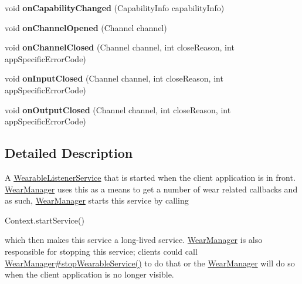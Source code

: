 \begin{DoxyCompactItemize}
\item 
void {\bfseries on\+Capability\+Changed} (Capability\+Info capability\+Info)\hypertarget{classcom_1_1google_1_1devrel_1_1wcl_1_1WclWearableListenerService_a2ac169d7eb2a0d1c819a3f5f6986dc48}{}\label{classcom_1_1google_1_1devrel_1_1wcl_1_1WclWearableListenerService_a2ac169d7eb2a0d1c819a3f5f6986dc48}

\item 
void {\bfseries on\+Channel\+Opened} (Channel channel)\hypertarget{classcom_1_1google_1_1devrel_1_1wcl_1_1WclWearableListenerService_a8a278225d0c328812d1356f91ea796d4}{}\label{classcom_1_1google_1_1devrel_1_1wcl_1_1WclWearableListenerService_a8a278225d0c328812d1356f91ea796d4}

\item 
void {\bfseries on\+Channel\+Closed} (Channel channel, int close\+Reason, int app\+Specific\+Error\+Code)\hypertarget{classcom_1_1google_1_1devrel_1_1wcl_1_1WclWearableListenerService_a6411a0d2884279e9c45590264f5f8311}{}\label{classcom_1_1google_1_1devrel_1_1wcl_1_1WclWearableListenerService_a6411a0d2884279e9c45590264f5f8311}

\item 
void {\bfseries on\+Input\+Closed} (Channel channel, int close\+Reason, int app\+Specific\+Error\+Code)\hypertarget{classcom_1_1google_1_1devrel_1_1wcl_1_1WclWearableListenerService_af6da2e024f570305f1aa94d8e5d2d206}{}\label{classcom_1_1google_1_1devrel_1_1wcl_1_1WclWearableListenerService_af6da2e024f570305f1aa94d8e5d2d206}

\item 
void {\bfseries on\+Output\+Closed} (Channel channel, int close\+Reason, int app\+Specific\+Error\+Code)\hypertarget{classcom_1_1google_1_1devrel_1_1wcl_1_1WclWearableListenerService_abefe65fa29df2f45cf44a5f8197f8c95}{}\label{classcom_1_1google_1_1devrel_1_1wcl_1_1WclWearableListenerService_abefe65fa29df2f45cf44a5f8197f8c95}

\end{DoxyCompactItemize}


\subsection{Detailed Description}
A \hyperlink{}{Wearable\+Listener\+Service} that is started when the client application is in front. \hyperlink{classcom_1_1google_1_1devrel_1_1wcl_1_1WearManager}{Wear\+Manager} uses this as a means to get a number of wear related callbacks and as such, \hyperlink{classcom_1_1google_1_1devrel_1_1wcl_1_1WearManager}{Wear\+Manager} starts this service by calling
\begin{DoxyCode}
Context.startService() 
\end{DoxyCode}
 which then makes this service a long-\/lived service. \hyperlink{classcom_1_1google_1_1devrel_1_1wcl_1_1WearManager}{Wear\+Manager} is also responsible for stopping this service; clients could call \hyperlink{classcom_1_1google_1_1devrel_1_1wcl_1_1WearManager_ab1fac2df063290c71ac555851a5066c6}{Wear\+Manager\#stop\+Wearable\+Service()} to do that or the \hyperlink{classcom_1_1google_1_1devrel_1_1wcl_1_1WearManager}{Wear\+Manager} will do so when the client application is no longer visible. 

